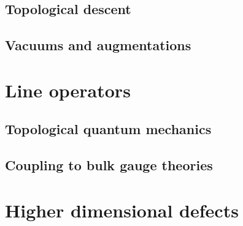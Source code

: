 \documentclass[11pt]{amsart}
\begin{document}
\subsection{Topological descent} 

\subsection{Vacuums and augmentations}

\section{Line operators}


\subsection{Topological quantum mechanics}


\subsection{Coupling to bulk gauge theories}


\section{Higher dimensional defects} 

\end{document}

